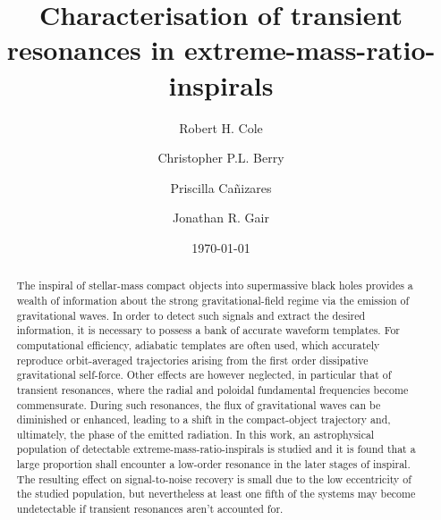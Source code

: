 \documentclass[aps,prd,amsfonts,amssymb,amsmath,nofootinbib,reprint,showpacs,superscriptaddress,twocolumn]{revtex4}
\begin{document}

\title{Characterisation of transient resonances in extreme-mass-ratio-inspirals}

\author{Robert H. Cole}
\author{Christopher P.L. Berry}
\author{Priscilla Ca\~{n}izares}
\author{Jonathan R. Gair}

\date{\today}

\begin{abstract}
The inspiral of stellar-mass compact objects into supermassive black holes provides a wealth of information about the strong gravitational-field regime via the emission of gravitational waves. In order to detect such signals and extract the desired information, it is necessary to possess a bank of accurate waveform templates. For computational efficiency, adiabatic templates are often used, which accurately reproduce orbit-averaged trajectories arising from the first order dissipative gravitational self-force. Other effects are however neglected, in particular that of transient resonances, where the radial and poloidal fundamental frequencies become commensurate. During such resonances, the flux of gravitational waves can be diminished or enhanced, leading to a shift in the compact-object trajectory and, ultimately, the phase of the emitted radiation. In this work, an astrophysical population of detectable extreme-mass-ratio-inspirals is studied and it is found that a large proportion shall encounter a low-order resonance in the later stages of inspiral. The resulting effect on signal-to-noise recovery is small due to the low eccentricity of the studied population, but nevertheless at least one fifth of the systems may become undetectable if transient resonances aren't accounted for.
\end{abstract}


\maketitle
\end{document}
